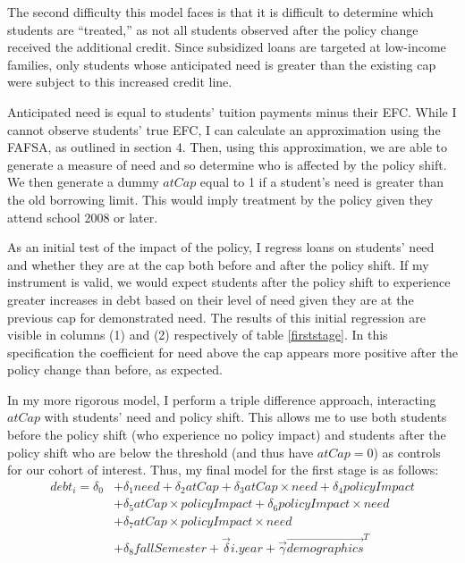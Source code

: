 \documentclass[12pt]{article}
\begin{document}
	The second difficulty this model faces is that it is difficult to determine which students are ``treated,'' as not all students observed after the policy change received the additional credit. Since subsidized loans are targeted at low-income families, only students whose anticipated need is greater than the existing cap were subject to this increased credit line. 
	
	Anticipated need is equal to students' tuition payments minus their EFC. While I cannot observe students' true EFC, I can calculate an approximation using the FAFSA, as outlined in section 4. Then, using this approximation, we are able to generate a measure of need and so determine who is affected by the policy shift. We then generate a dummy $atCap$ equal to 1 if a student's need is greater than the old borrowing limit. This would imply treatment by the policy given they attend school 2008 or later.
	
	As an initial test of the impact of the policy, I regress loans on students' need and whether they are at the cap both before and after the policy shift. If my instrument is valid, we would expect students after the policy shift to experience greater increases in debt based on their level of need given they are at the previous cap for demonstrated need. The results of this initial regression are visible in columns (1) and (2) respectively of table \ref{firststage}. In this specification the coefficient for need above the cap appears more positive after the policy change than before, as expected. 
	
	In my more rigorous model, I perform a triple difference approach, interacting $atCap$ with students' need and policy shift. This allows me to use both students before the policy shift (who experience no policy impact) and students after the policy shift who are below the threshold (and thus have $atCap = 0$) as controls for our cohort of interest. Thus, my final model for the first stage is as follows: 
	\begin{equation}
	\begin{aligned}
	debt_i = \delta_0 &+ \delta_1 need + \delta_2 atCap + \delta_3 atCap \times need + \delta_4 policyImpact \\
	&+ \delta_5 atCap \times policyImpact + \delta_6 policyImpact \times need \\
	&+ \delta_7 atCap \times policyImpact \times need \\
	&+ \delta_8 fallSemester + \vec{\delta} i.year + \vec{\gamma} \vec{demographics}^T
	 \end{aligned}
	 \end{equation} 
	 
\end{document}
